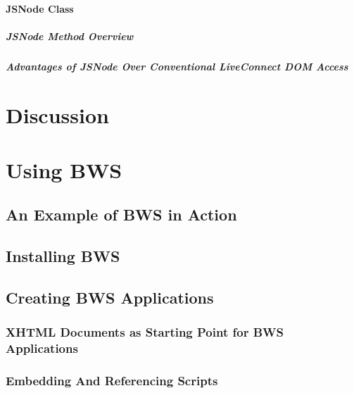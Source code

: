     \subsubsection{JSNode Class}
    
     
     
     \paragraph{JSNode Method Overview}
     
      
      
     \paragraph{Advantages of JSNode Over Conventional LiveConnect DOM Access}
     
      
     
\chapter{Discussion}
 \label{sec:discussion}
 

\chapter{Using BWS}
 \label{sec:usingBWS}
 

 \section{An Example of BWS in Action}
 \section{Installing BWS}
 \section{Creating BWS Applications}
 \label{sec:CreatingBWSApplications}
 
  \subsection{XHTML Documents as Starting Point for BWS Applications}
  \label{sec:XHTMLDocumentsAsStartingPoint}

   

  \subsection{Embedding And Referencing Scripts}

